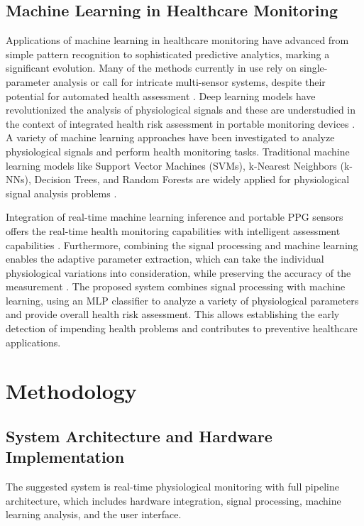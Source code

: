 \documentclass{ieeeaccess}
\begin{document}
\subsection{Machine Learning in Healthcare Monitoring}

Applications of machine learning in healthcare monitoring have advanced from simple pattern recognition to sophisticated predictive analytics, marking a significant evolution. Many of the methods currently in use rely on single-parameter analysis or call for intricate multi-sensor systems, despite their potential for automated health assessment \cite{b13}. Deep learning models have revolutionized the analysis of physiological signals and these are understudied in the context of integrated health risk assessment in portable monitoring devices \cite{b14}. A variety of machine learning approaches have been investigated to analyze physiological signals and perform health monitoring tasks. Traditional machine learning models like Support Vector Machines (SVMs), k-Nearest Neighbors (k-NNs), Decision Trees, and Random Forests are widely applied for physiological signal analysis problems .

Integration of real-time machine learning inference and portable PPG sensors offers the real-time health monitoring capabilities with intelligent assessment capabilities \cite{b15}. Furthermore, combining the signal processing and machine learning enables the adaptive parameter extraction, which can take the individual physiological variations into consideration, while preserving the accuracy of the measurement \cite{b16}. The proposed system combines signal processing with machine learning, using an MLP classifier to analyze a variety of physiological parameters and provide overall health risk assessment. This allows establishing the early detection of impending health problems and contributes to preventive healthcare applications.


\section{Methodology}
\label{sec:methodology}
\subsection{System Architecture and Hardware Implementation}

The suggested system is real-time physiological monitoring with full pipeline architecture, which includes hardware integration, signal processing, machine learning analysis, and the user interface.
\end{document}
